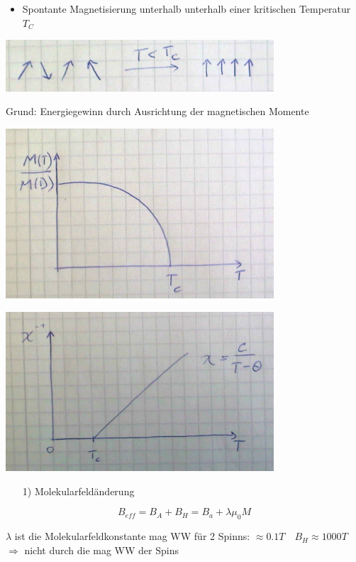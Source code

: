 \begin{itemize}
\item Spontante Magnetisierung unterhalb unterhalb einer kritischen Temperatur \(T_C\)
\end{itemize}
\includegraphics[width=0.75\textwidth]{kap12_09.png}

Grund: Energiegewinn durch Ausrichtung der magnetischen Momente

\includegraphics[width=0.75\textwidth]{kap12_10.png}



\includegraphics[width=0.75\textwidth]{kap12_11.png}



\begin{itemize}
\item[1)] Molekularfeldänderung
\end{itemize}
\[B_{eff}=B_A+B_H=B_a+\lambda\mu_0 M\]

\(\lambda\) ist die Molekularfeldkonstante mag WW für 2 Spinns: \(\approx 0.1 T\quad B_H\approx 1000T\)
\(\Rightarrow \) nicht durch die mag WW der Spins

